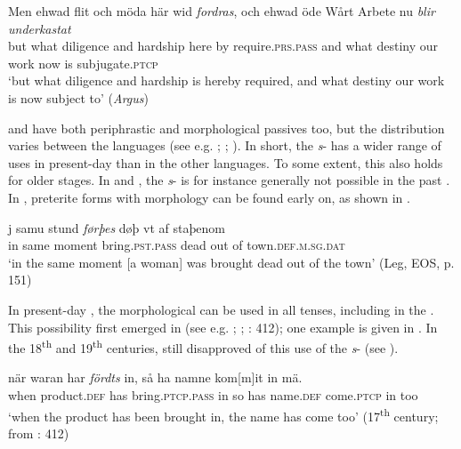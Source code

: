 \documentclass[output=paper]{langscibook}
\begin{document}
\ea\label{ex:intro:29}
\gll  Men  ehwad   flit         och   möda     här     wid \textit{fordras}, och ehwad öde   Wårt   Arbete nu \textit{blir} \textit{underkastat}\\
but   what   diligence and   hardship   here   by    require\textsc{.prs.pass} and what  destiny our     work   now   is     subjugate\textsc{.ptcp}\\
\glt ‘but what diligence and hardship is hereby required, and what destiny our work is now subject to’ (\textit{Argus})
\z

 and  have both periphrastic and morphological passives too, but the distribution varies between the languages (see e.g. \citealt{Engdahl2006}; \citealt{Laanemets2012}; \citealt{Faarlund2019}). In short, the \textit{s}{}- has a wider range of uses in present-day  than in the other languages. To some extent, this also holds for older stages. In  and , the \textit{s}{}- is for instance generally not possible in the past . In , preterite forms with  morphology can be found early on, as shown in .


\ea\label{ex:intro:30}
\gll j     samu   stund \textit{førþes} døþ     vt     af staþenom\\
in   same     moment bring\textsc{.pst.pass}   dead     out   of town.\textsc{def.m.sg.dat}\\
\glt ‘in the same moment [a woman] was brought dead out of the town’ (Leg, EOS, p. 151)
\z


In present-day , the morphological  can be used in all tenses, including in the . This possibility first emerged in  (see e.g. \citealt{Holm1952}; \citealt{Platzack1989}; \citealt{Larsson2009}: 412); one example is given in . In the 18\textsuperscript{th} and 19\textsuperscript{th} centuries,  still disapproved of this use of the \textit{s}{}- (see \citealt{Platzack1989}).


\ea\label{ex:intro:31}
\gll när     waran       har \textit{fördts} in, så ha   namne      kom[m]it in mä.\\
  when product\textsc{.def}  has bring.\textsc{ptcp.pass}     in  so has name\textsc{.def} come\textsc{.ptcp} in too\\
\glt ‘when the product has been brought in, the name has come too’ (17\textsuperscript{th} century; from \citealt{Larsson2009}: 412)
\z
\end{document}
